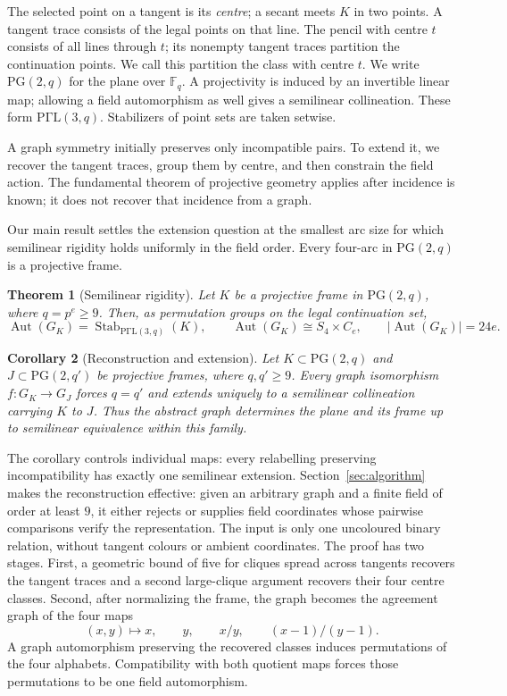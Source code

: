 \documentclass[11pt]{article}
\newtheorem{theorem}{Theorem}[section]
\newtheorem{corollary}[theorem]{Corollary}
\theoremstyle{definition}
\theoremstyle{remark}
\newcommand{\F}{\mathbb F}
\newcommand{\PG}{\mathrm{PG}}
\newcommand{\PGammaL}{\mathrm{P\Gamma L}}
\newcommand{\Aut}{\operatorname{Aut}}
\newcommand{\Stab}{\operatorname{Stab}}
\begin{document}
The selected point on a tangent is its \emph{centre}; a secant meets $K$
in two points. A tangent trace consists of the legal points on
that line. The pencil with centre $t$ consists of all lines through $t$;
its nonempty tangent traces partition the continuation points. We call this
partition the class with centre $t$.
We write $\PG(2,q)$ for the plane over $\F_q$. A projectivity is induced
by an invertible linear map; allowing a field automorphism as well gives
a semilinear collineation. These form $\PGammaL(3,q)$. Stabilizers of
point sets are taken setwise.

A graph symmetry initially preserves only incompatible pairs. To extend
it, we recover the tangent traces, group them by centre, and then constrain
the field action. The fundamental theorem of projective geometry applies
after incidence is known; it does not recover that incidence from a graph.

Our main result settles the extension question at the smallest arc size
for which semilinear rigidity holds uniformly in the field order.  Every four-arc in $\PG(2,q)$ is a projective frame.

\begin{theorem}[Semilinear rigidity]\label{thm:main}
Let $K$ be a projective frame in $\PG(2,q)$, where $q=p^e\geq9$.  Then, as
permutation groups on the legal continuation set,
\[
  \Aut(G_K)=\Stab_{\PGammaL(3,q)}(K),
  \qquad \Aut(G_K)\cong S_4\times C_e,
  \qquad |\Aut(G_K)|=24e.
\]
\end{theorem}

\begin{corollary}[Reconstruction and extension]\label{cor:reconstruction}
Let $K\subset\PG(2,q)$ and $J\subset\PG(2,q')$ be projective frames,
where $q,q'\ge9$. Every graph isomorphism $f:G_K\to G_J$ forces
$q=q'$ and extends uniquely to a semilinear collineation carrying $K$
to $J$. Thus the abstract graph determines the plane and its frame up
to semilinear equivalence within this family.
\end{corollary}



The corollary controls individual maps: every relabelling preserving
incompatibility has exactly one semilinear extension.
Section~\ref{sec:algorithm} makes the reconstruction effective: given an
arbitrary graph and a finite field of order at least $9$, it either
rejects or supplies field
coordinates whose pairwise comparisons verify the representation.
The input is only one uncoloured binary relation, without tangent colours
or ambient coordinates. The proof has two stages. First, a geometric bound of five for cliques spread across tangents recovers
the tangent traces and a second large-clique argument recovers their four
centre classes.  Second, after normalizing the frame, the graph becomes the
agreement graph of the four maps
\[
  (x,y)\longmapsto x,\qquad y,\qquad x/y,\qquad
  (x-1)/(y-1).
\]
A graph automorphism preserving the recovered classes induces permutations
of the four alphabets.  Compatibility with both quotient maps forces those
permutations to be one field automorphism.
\end{document}
